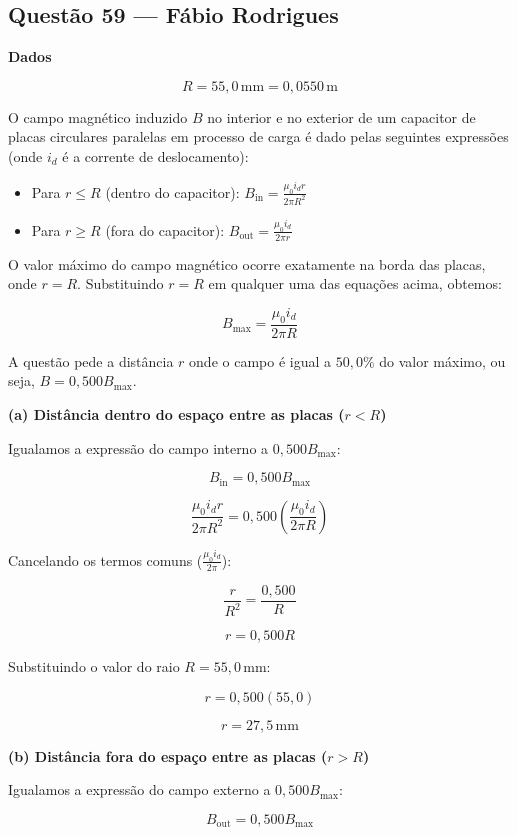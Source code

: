 \documentclass[12pt,a4paper]{article}
\begin{document}
\subsection{Questão 59 — Fábio Rodrigues}
\textbf{Dados}

\[
R = 55,0\,\text{mm} = 0,0550\,\text{m}
\]

O campo magnético induzido \(B\) no interior e no exterior de um capacitor de placas circulares paralelas em processo de carga é dado pelas seguintes expressões (onde \(i_d\) é a corrente de deslocamento):

\begin{itemize}
    \item Para \(r \le R\) (dentro do capacitor): \(B_{\text{in}} = \frac{\mu_0 i_d r}{2\pi R^2}\)
    \item Para \(r \ge R\) (fora do capacitor): \(B_{\text{out}} = \frac{\mu_0 i_d}{2\pi r}\)
\end{itemize}

O valor máximo do campo magnético ocorre exatamente na borda das placas, onde \(r = R\). Substituindo \(r = R\) em qualquer uma das equações acima, obtemos:

\[
B_{\text{max}} = \frac{\mu_0 i_d}{2\pi R}
\]

A questão pede a distância \(r\) onde o campo é igual a \(50,0\%\) do valor máximo, ou seja, \(B = 0,500 B_{\text{max}}\).

\textbf{(a) Distância dentro do espaço entre as placas (\(r < R\))}

Igualamos a expressão do campo interno a \(0,500 B_{\text{max}}\):

\[
B_{\text{in}} = 0,500 B_{\text{max}}
\]

\[
\frac{\mu_0 i_d r}{2\pi R^2} = 0,500 \left( \frac{\mu_0 i_d}{2\pi R} \right)
\]

Cancelando os termos comuns (\(\frac{\mu_0 i_d}{2\pi}\)):

\[
\frac{r}{R^2} = \frac{0,500}{R}
\]

\[
r = 0,500 R
\]

Substituindo o valor do raio \(R = 55,0\,\text{mm}\):

\[
r = 0,500(55,0)
\]

\[
\boxed{r = 27,5\,\text{mm}}
\]

\textbf{(b) Distância fora do espaço entre as placas (\(r > R\))}

Igualamos a expressão do campo externo a \(0,500 B_{\text{max}}\):

\[
B_{\text{out}} = 0,500 B_{\text{max}}
\]
\end{document}
